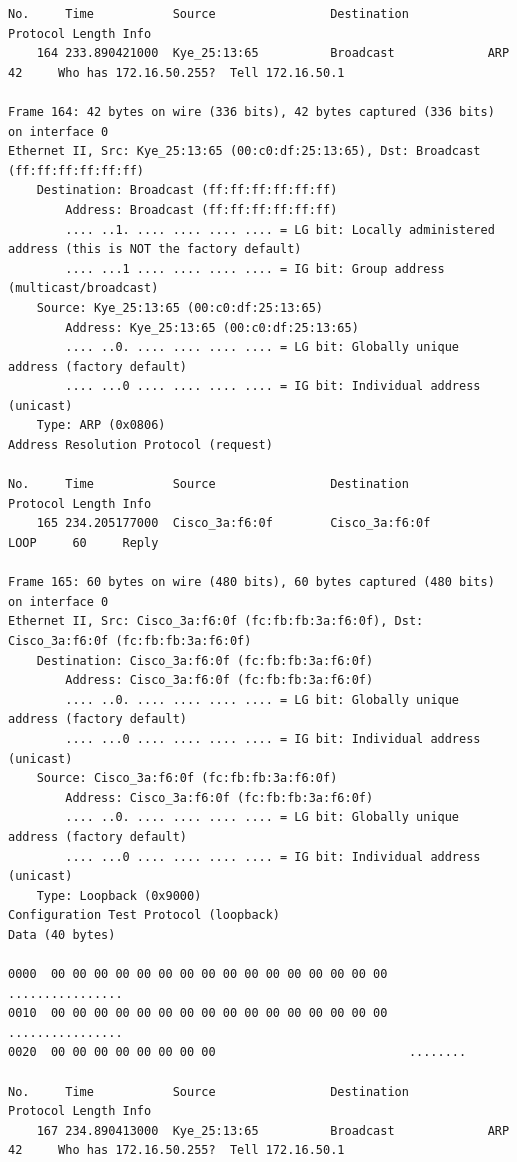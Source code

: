 \documentclass[a4paper,11pt]{article}
\begin{document}
\begin{lstlisting}
No.     Time           Source                Destination           Protocol Length Info
    164 233.890421000  Kye_25:13:65          Broadcast             ARP      42     Who has 172.16.50.255?  Tell 172.16.50.1

Frame 164: 42 bytes on wire (336 bits), 42 bytes captured (336 bits) on interface 0
Ethernet II, Src: Kye_25:13:65 (00:c0:df:25:13:65), Dst: Broadcast (ff:ff:ff:ff:ff:ff)
    Destination: Broadcast (ff:ff:ff:ff:ff:ff)
        Address: Broadcast (ff:ff:ff:ff:ff:ff)
        .... ..1. .... .... .... .... = LG bit: Locally administered address (this is NOT the factory default)
        .... ...1 .... .... .... .... = IG bit: Group address (multicast/broadcast)
    Source: Kye_25:13:65 (00:c0:df:25:13:65)
        Address: Kye_25:13:65 (00:c0:df:25:13:65)
        .... ..0. .... .... .... .... = LG bit: Globally unique address (factory default)
        .... ...0 .... .... .... .... = IG bit: Individual address (unicast)
    Type: ARP (0x0806)
Address Resolution Protocol (request)

No.     Time           Source                Destination           Protocol Length Info
    165 234.205177000  Cisco_3a:f6:0f        Cisco_3a:f6:0f        LOOP     60     Reply

Frame 165: 60 bytes on wire (480 bits), 60 bytes captured (480 bits) on interface 0
Ethernet II, Src: Cisco_3a:f6:0f (fc:fb:fb:3a:f6:0f), Dst: Cisco_3a:f6:0f (fc:fb:fb:3a:f6:0f)
    Destination: Cisco_3a:f6:0f (fc:fb:fb:3a:f6:0f)
        Address: Cisco_3a:f6:0f (fc:fb:fb:3a:f6:0f)
        .... ..0. .... .... .... .... = LG bit: Globally unique address (factory default)
        .... ...0 .... .... .... .... = IG bit: Individual address (unicast)
    Source: Cisco_3a:f6:0f (fc:fb:fb:3a:f6:0f)
        Address: Cisco_3a:f6:0f (fc:fb:fb:3a:f6:0f)
        .... ..0. .... .... .... .... = LG bit: Globally unique address (factory default)
        .... ...0 .... .... .... .... = IG bit: Individual address (unicast)
    Type: Loopback (0x9000)
Configuration Test Protocol (loopback)
Data (40 bytes)

0000  00 00 00 00 00 00 00 00 00 00 00 00 00 00 00 00   ................
0010  00 00 00 00 00 00 00 00 00 00 00 00 00 00 00 00   ................
0020  00 00 00 00 00 00 00 00                           ........

No.     Time           Source                Destination           Protocol Length Info
    167 234.890413000  Kye_25:13:65          Broadcast             ARP      42     Who has 172.16.50.255?  Tell 172.16.50.1


\end{lstlisting}
\end{document}
